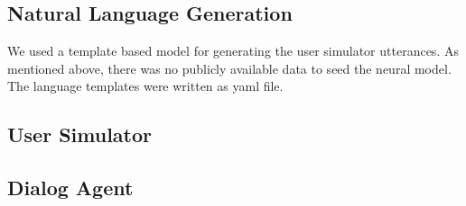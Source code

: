 \subsection{ Natural Language Generation}

We used a template based model for generating the user simulator utterances. As mentioned above, there was no publicly available data to seed the neural model. The language templates were written as yaml file.

\subsection{User Simulator}



\subsection{Dialog Agent}



